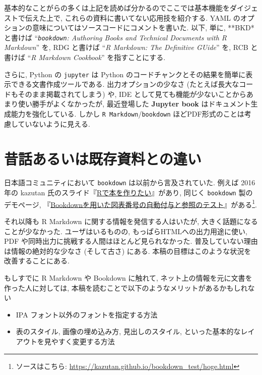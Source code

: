 \documentclass[
  nomag]{bxjsbook}
\providecommand{\tightlist}{%
  \setlength{\itemsep}{0pt}\setlength{\parskip}{0pt}}
\theoremstyle{definition}
\theoremstyle{definition}
\theoremstyle{definition}
\theoremstyle{remark}
\begin{document}
基本的なことがらの多くは上記を読めば分かるのでここでは基本機能をダイジェストで伝えた上で,
これらの資料に書いてない応用技を紹介する. YAML
のオプションの意味についてはソースコードにコメントを書いた. 以下, 単に,
**BKD* と書けば ``\emph{\texttt{bookdown}: Authoring Books and Technical
Documents with R Markdown}'' \autocite{R-bookdown} を, RDG と書けば
``\emph{R Markdown: The Definitive GUide}'' \autocite{rmarkdown2018} を,
RCB と書けば ``\emph{R Markdown Cookbook}'' \autocite{xie2020Markdown}
を指すことにする.

さらに, Python の \texttt{jupyter} は Python
のコードチャンクとその結果を簡単に表示できる文書作成ツールである.
出力オプションの少なさ (たとえば長大なコードもそのまま掲載されてしまう)
や, IDE として見ても機能が少ないことからあまり使い勝手がよくなかったが,
最近登場した \textbf{Jupyter book} はドキュメント生成能力を強化している.
しかし \texttt{R\ Markdown}/\texttt{bookdown}
ほどPDF形式のことは考慮していないように見える.

\hypertarget{ux6614ux8a71ux3042ux308bux3044ux306fux65e2ux5b58ux8cc7ux6599ux3068ux306eux9055ux3044}{%
\section*{昔話あるいは既存資料との違い}\label{ux6614ux8a71ux3042ux308bux3044ux306fux65e2ux5b58ux8cc7ux6599ux3068ux306eux9055ux3044}}

日本語コミュニティにおいて \texttt{bookdown} は以前から言及されていた.
例えば 2016 年の kazutan
氏のスライド『\href{https://kazutan.github.io/JapanR2016/JapanR2016.html\#/}{Rで本を作りたい}』があり,
同じく \texttt{bookdown} 製のデモページ,
『\href{https://kazutan.github.io/bookdown_test/hoge.html}{Bookdownを用いた図表番号の自動付与と参照のテスト}』がある\footnote{ソースはこちら:
  \url{https://kazutan.github.io/bookdown_test/hoge.html}}.

それ以降も R Markdown に関する情報を発信する人はいたが,
大きく話題になることが少なかった. ユーザはいるものの,
もっぱらHTMLへの出力用途に使い, PDF
や同時出力に挑戦する人間はほとんど見られなかった.
普及していない理由は情報の絶対的な少なさ (そして古さ) にある.
本稿の目標はこのような状況を改善することにある.

もしすでに R Markdown や Bookdown に触れて,
ネット上の情報を元に文書を作った人に対しては,
本稿を読むことで以下のようなメリットがあるかもしれない

\begin{itemize}
\tightlist
\item
  IPA フォント以外のフォントを指定する方法
\item
  表のスタイル, 画像の埋め込み方, 見出しのスタイル,
  といった基本的なレイアウトを見やすく変更する方法
\end{itemize}
\end{document}
